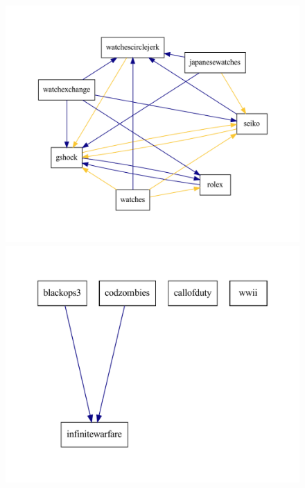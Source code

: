 \documentclass[letterpaper]{article}\usepackage[]{graphicx}\usepackage[]{color}
\def\Slash{\slash\hspace{0pt}}
\begin{document}
\begin{figure}
\begin{minipage}[t][][t]{\columnwidth}
  \centering
  \hspace*{-0.1\columnwidth}\includegraphics[width=1.2\columnwidth]{figures/watches_graphviz.pdf}
\end{minipage}
\hfill
\begin{minipage}[t][][t]{\columnwidth}
  \centering
  \hspace*{-0.1\columnwidth}\includegraphics[width=1.2\columnwidth]{figures/cod_graphviz.pdf}

\end{minipage}
\end{figure}
\end{document}
